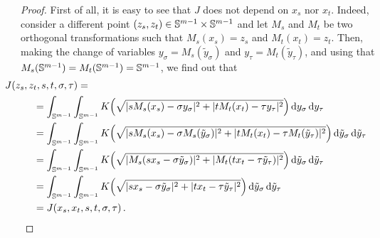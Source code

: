\begin{proof}
First of all, it is easy to see that $J$ does not depend on $x_s$ nor $x_t$. Indeed, consider a different point $(z_s, z_t)\in \mathbb{S}^{m-1} \times \mathbb{S}^{m-1}$ and let $M_s$ and $M_t$ be two orthogonal transformations such that $M_s(x_s) = z_s$ and $M_t(x_t) = z_t$. Then, making the change of variables $y_\sigma = M_s(\tilde{y}_\sigma)$ and $y_\tau = M_t(\tilde{y}_\tau)$, and using that $M_s( \mathbb{S}^{m-1}) = M_t(\mathbb{S}^{m-1}) = \mathbb{S}^{m-1}$, we find out that
\begin{align*}
& \hspace{-1cm} J(z_s, z_t, s,t,\sigma, \tau) = \\
&= \int_{\Sph^{m-1}}  \int_{\Sph^{m-1}} K \Big( \sqrt{|s M_s(x_s) - \sigma y_\sigma|^2 + |t M_t(x_t) - \tau y_\tau|^2 }\Big) \d y_\sigma \d y_\tau \\
&= \int_{\Sph^{m-1}}  \int_{\Sph^{m-1}} K \Big( \sqrt{|s M_s(x_s) - \sigma M_s(\tilde{y}_\sigma)|^2 + |t M_t(x_t) - \tau M_t(\tilde{y}_\tau)|^2 }\Big) \d \tilde{y}_\sigma \d \tilde{y}_\tau \\
&= \int_{\Sph^{m-1}}  \int_{\Sph^{m-1}} K\Big ( \sqrt{|M_s(sx_s - \sigma \tilde{y}_\sigma)|^2 + |M_t(t x_t - \tau \tilde{y}_\tau)|^2 }\Big) \d \tilde{y}_\sigma \d \tilde{y}_\tau \\
&= \int_{\Sph^{m-1}}  \int_{\Sph^{m-1}} K\Big ( \sqrt{|sx_s - \sigma \tilde{y}_\sigma|^2 + |t x_t - \tau \tilde{y}_\tau|^2 }\Big) \d \tilde{y}_\sigma \d \tilde{y}_\tau \\
&= J(x_s, x_t, s,t,\sigma, \tau) \,.
\end{align*}


\end{proof}
